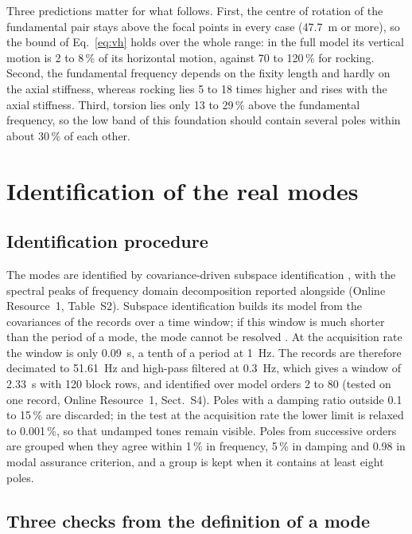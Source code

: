 \documentclass[11pt]{article}
\begin{document}
Three predictions matter for what follows. First, the centre of rotation of the fundamental pair stays above the focal points in every case (47.7~m or more), so the bound of Eq.~\eqref{eq:vh} holds over the whole range: in the full model its vertical motion is 2 to 8\,\% of its horizontal motion, against 70 to 120\,\% for rocking. Second, the fundamental frequency depends on the fixity length and hardly on the axial stiffness, whereas rocking lies 5 to 18 times higher and rises with the axial stiffness. Third, torsion lies only 13 to 29\,\% above the fundamental frequency, so the low band of this foundation should contain several poles within about 30\,\% of each other.

\section{Identification of the real modes}
\label{sec:ident}

\subsection{Identification procedure}
\label{sec:procedure}

The modes are identified by covariance-driven subspace identification \cite{peeters1999,overschee1996}, with the spectral peaks of frequency domain decomposition \cite{brincker2001} reported alongside (Online Resource~1, Table~S2). Subspace identification builds its model from the covariances of the records over a time window; if this window is much shorter than the period of a mode, the mode cannot be resolved \cite{priori2018}. At the acquisition rate the window is only 0.09~s, a tenth of a period at 1~Hz. The records are therefore decimated to 51.61~Hz and high-pass filtered at 0.3~Hz, which gives a window of 2.33~s with 120 block rows, and identified over model orders 2 to 80 (tested on one record, Online Resource~1, Sect.~S4). Poles with a damping ratio outside 0.1 to 15\,\% are discarded; in the test at the acquisition rate the lower limit is relaxed to 0.001\,\%, so that undamped tones remain visible. Poles from successive orders are grouped when they agree within 1\,\% in frequency, 5\,\% in damping and 0.98 in modal assurance criterion, and a group is kept when it contains at least eight poles.

\subsection{Three checks from the definition of a mode}
\label{sec:checks}
\end{document}
